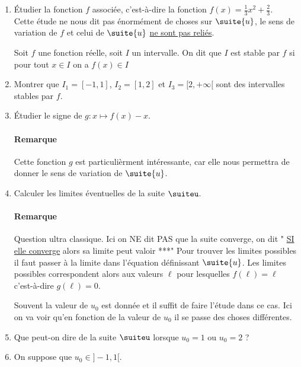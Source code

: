 \documentclass[a4paper, 11pt]{article}
\begin{document}
\begin{enumerate}
\item \'Etudier la fonction $f$ associ\'ee, c'est-à-dire la fonction $f(x)=\frac{1}{3}x^2+\frac{2}{3}$. \\
\warning Cette étude ne nous dit pas énormément de choses sur $\suite{u}$, le sens de variation de $f$ et celui de $\suite{u}$ \underline{ne sont pas reliés}.
\newpage

\begin{defi}
Soit $f$ une fonction réelle, soit $I$ un intervalle. On dit que $I$ est stable par $f$ si pour tout $x\in I$ on a $f(x)\in I$
\end{defi}
\item Montrer que $I_1=[-1,1]$, $I_2= [1,2]$ et $I_3=[2,+\infty[$ sont des intervalles stables par $f$. 
\vspace{5cm}
\item \'Etudier le signe de $g: x\mapsto f(x)-x$.
\vspace*{-0.5cm}
\paragraph{Remarque} Cette fonction $g$ est particulièrment intéressante, car elle nous permettra de donner le sens de variation de $\suite{u}$. 
\newpage

\item Calculer les limites \'eventuelles de la suite $\suiteu$.
\vspace*{-0.5cm}
\paragraph{Remarque} Question ultra classique. \warning Ici on NE dit PAS que la suite converge, on dit " \underline{SI elle converge} alors sa limite peut valoir ***"  Pour trouver les limites possibles il faut passer à la limite dans l'équation définissant $\suite{u}$. Les limites possibles correspondent alors aux valeurs $\ell$ pour lesquelles $f(\ell) =\ell$ c'est-à-dire $g(\ell)=0$.
\vspace{9cm}


Souvent la valeur de $u_0$ est donnée et  il suffit de faire l'étude dans ce cas. Ici on va voir qu'en fonction de la valeur de $u_0$ il se passe des choses différentes. 
\item Que peut-on dire de la suite $\suiteu$ lorsque $u_0=1$ ou $u_0=2$ ?
\newpage

\item On suppose que $u_0\in\rbrack -1,1\lbrack$.

\end{enumerate}
\end{document}
